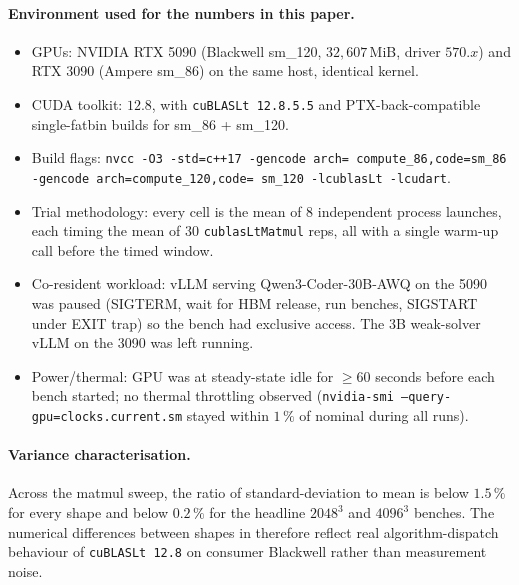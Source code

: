 \documentclass[11pt,a4paper]{article}
\begin{document}
\paragraph{Environment used for the numbers in this paper.}
\begin{itemize}
    \item GPUs: NVIDIA RTX 5090 (Blackwell sm\_120, $32{,}607$\,MiB,
          driver $570.x$) and RTX 3090 (Ampere sm\_86) on the same
          host, identical kernel.
    \item CUDA toolkit: $12.8$, with \texttt{cuBLASLt 12.8.5.5} and
          PTX-back-compatible single-fatbin builds for sm\_86 +
          sm\_120.
    \item Build flags: \texttt{nvcc -O3 -std=c++17 -gencode arch=
          compute\_86,code=sm\_86 -gencode arch=compute\_120,code=
          sm\_120 -lcublasLt -lcudart}.
    \item Trial methodology: every  cell is the
          mean of $8$ independent process launches, each timing the
          mean of $30$ \texttt{cublasLtMatmul} reps, all with a
          single warm-up call before the timed window.
    \item Co-resident workload: vLLM serving Qwen3-Coder-30B-AWQ on
          the 5090 was paused (SIGTERM, wait for HBM release, run
          benches, SIGSTART under EXIT trap) so the bench had
          exclusive access. The 3B weak-solver vLLM on the 3090 was
          left running.
    \item Power/thermal: GPU was at steady-state idle for $\geq 60$
          seconds before each bench started; no thermal throttling
          observed (\texttt{nvidia-smi --query-gpu=clocks.current.sm}
          stayed within $1\,\%$ of nominal during all runs).
\end{itemize}

\paragraph{Variance characterisation.} Across the matmul sweep, the
ratio of standard-deviation to mean is below $1.5\,\%$ for every
shape and below $0.2\,\%$ for the headline $2048^3$ and $4096^3$
benches. The numerical differences between shapes in
 therefore reflect real algorithm-dispatch behaviour
of \texttt{cuBLASLt 12.8} on consumer Blackwell rather than
measurement noise.
\end{document}

